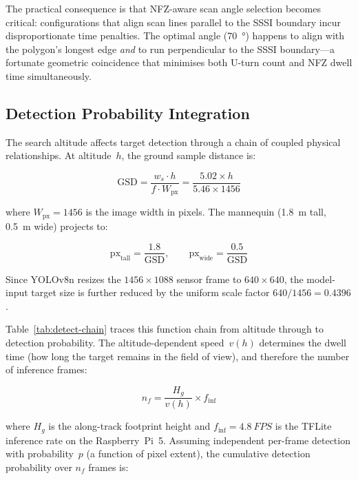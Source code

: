 The practical consequence is that NFZ-aware scan angle selection becomes critical: configurations that align scan lines parallel to the SSSI boundary incur disproportionate time penalties.
The optimal angle (\SI{70}{\degree}) happens to align with the polygon's longest edge \emph{and} to run perpendicular to the SSSI boundary---a fortunate geometric coincidence that minimises both U-turn count and NFZ dwell time simultaneously.

\subsection{Detection Probability Integration}\label{sec:detect-prob}

The search altitude affects target detection through a chain of coupled physical relationships.
At altitude~$h$, the ground sample distance is:

\begin{equation}\label{eq:gsd}
  \mathrm{GSD} = \frac{w_s \cdot h}{f \cdot W_{\mathrm{px}}} = \frac{5.02 \times h}{5.46 \times 1456}
\end{equation}

\noindent where $W_{\mathrm{px}} = 1456$ is the image width in pixels.
The mannequin (\SI{1.8}{\metre} tall, \SI{0.5}{\metre} wide) projects to:

\begin{equation}
  \mathrm{px}_{\mathrm{tall}} = \frac{1.8}{\mathrm{GSD}}, \qquad
  \mathrm{px}_{\mathrm{wide}} = \frac{0.5}{\mathrm{GSD}}
\end{equation}

\noindent Since YOLOv8n resizes the $1456 \times 1088$ sensor frame to $640 \times 640$, the model-input target size is further reduced by the uniform scale factor $640/1456 = 0.4396$.

Table~\ref{tab:detect-chain} traces this function chain from altitude through to detection probability.
The altitude-dependent speed~$v(h)$ determines the dwell time (how long the target remains in the field of view), and therefore the number of inference frames:

\begin{equation}\label{eq:dwell}
  n_f = \frac{H_g}{v(h)} \times f_{\mathrm{inf}}
\end{equation}

\noindent where $H_g$ is the along-track footprint height and $f_{\mathrm{inf}} = \SI{4.8}{FPS}$ is the TFLite inference rate on the Raspberry~Pi~5.
Assuming independent per-frame detection with probability~$p$ (a function of pixel extent), the cumulative detection probability over $n_f$ frames is:

